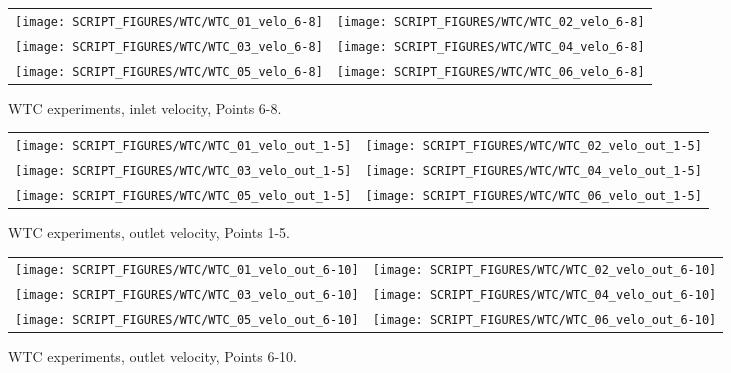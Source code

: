 \begin{figure}[p]
\begin{tabular*}{\textwidth}{l@{\extracolsep{\fill}}r}
\texttt{[image: SCRIPT\_FIGURES/WTC/WTC\_01\_velo\_6-8]} &
\texttt{[image: SCRIPT\_FIGURES/WTC/WTC\_02\_velo\_6-8]} \\
\texttt{[image: SCRIPT\_FIGURES/WTC/WTC\_03\_velo\_6-8]} &
\texttt{[image: SCRIPT\_FIGURES/WTC/WTC\_04\_velo\_6-8]} \\
\texttt{[image: SCRIPT\_FIGURES/WTC/WTC\_05\_velo\_6-8]} &
\texttt{[image: SCRIPT\_FIGURES/WTC/WTC\_06\_velo\_6-8]}
\end{tabular*}
\caption[WTC experiments, inlet velocity, Points 6-8]{WTC experiments, inlet velocity, Points 6-8.}
\label{WTC_velo_6-8}
\end{figure}

\begin{figure}[p]
\begin{tabular*}{\textwidth}{l@{\extracolsep{\fill}}r}
\texttt{[image: SCRIPT\_FIGURES/WTC/WTC\_01\_velo\_out\_1-5]} &
\texttt{[image: SCRIPT\_FIGURES/WTC/WTC\_02\_velo\_out\_1-5]} \\
\texttt{[image: SCRIPT\_FIGURES/WTC/WTC\_03\_velo\_out\_1-5]} &
\texttt{[image: SCRIPT\_FIGURES/WTC/WTC\_04\_velo\_out\_1-5]} \\
\texttt{[image: SCRIPT\_FIGURES/WTC/WTC\_05\_velo\_out\_1-5]} &
\texttt{[image: SCRIPT\_FIGURES/WTC/WTC\_06\_velo\_out\_1-5]}
\end{tabular*}
\caption[WTC experiments, outlet velocity, Points 1-5]{WTC experiments, outlet velocity, Points 1-5.}
\label{WTC_velo_out_1-5}
\end{figure}

\begin{figure}[p]
\begin{tabular*}{\textwidth}{l@{\extracolsep{\fill}}r}
\texttt{[image: SCRIPT\_FIGURES/WTC/WTC\_01\_velo\_out\_6-10]} &
\texttt{[image: SCRIPT\_FIGURES/WTC/WTC\_02\_velo\_out\_6-10]} \\
\texttt{[image: SCRIPT\_FIGURES/WTC/WTC\_03\_velo\_out\_6-10]} &
\texttt{[image: SCRIPT\_FIGURES/WTC/WTC\_04\_velo\_out\_6-10]} \\
\texttt{[image: SCRIPT\_FIGURES/WTC/WTC\_05\_velo\_out\_6-10]} &
\texttt{[image: SCRIPT\_FIGURES/WTC/WTC\_06\_velo\_out\_6-10]}
\end{tabular*}
\caption[WTC experiments, outlet velocity, Points 6-10]{WTC experiments, outlet velocity, Points 6-10.}
\label{WTC_velo_out_6-10}
\end{figure}



